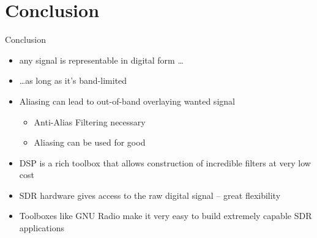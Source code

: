 \documentclass{beamer}
\begin{document}
\section{Conclusion}
\begin{frame}{Conclusion}
  \begin{itemize}
    \item any signal is representable in digital form \ldots
    \item \ldots as long as it's band-limited
    \item Aliasing can lead to out-of-band overlaying wanted signal
    \begin{itemize}
      \item Anti-Alias Filtering necessary
      \item Aliasing can be used for good
    \end{itemize}
    \item DSP is a rich toolbox that allows construction of incredible filters at very low cost
    \item SDR hardware gives access to the raw digital signal -- great flexibility
    \item Toolboxes like GNU Radio make it very easy to build extremely capable SDR applications
  \end{itemize}
\end{frame}
\end{document}
